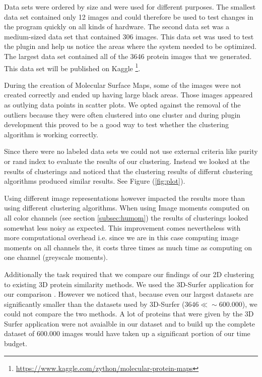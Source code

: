 \documentclass[journal]{vgtc}       %
\begin{document}
Data sets were ordered by size and were used for different purposes. The smallest data set contained only 12 images and could therefore be used to test changes in the program quickly on all kinds of hardware. The second data set was a medium-sized data set that contained 306 images. This data set was used to test the plugin and help us notice the areas where the system needed to be optimized. The largest data set contained all of the 3646 protein images that we generated. This data set will be published on Kaggle \footnote{\url{https://www.kaggle.com/zython/molecular-protein-maps}}.

During the creation of Molecular Surface Maps, some of the images were not created correctly and ended up having  large  black areas. Those images appeared as outlying data points in scatter plots. We opted against the removal of the outliers because they were often clustered into one cluster and during plugin development this proved to be a good way to test whether the clustering algorithm is working correctly.

Since there were no labeled data sets we could not use external criteria like purity or rand index to evaluate the results of our clustering. Instead we looked at the results of clusterings and noticed that the clustering results of differnt clustering algorithms produced similar results. See Figure (\ref{fig:plot}).

Using different image representations however impacted the results more than using different clustering algorithms. When using Image moments computed on all color channels (see section \ref{subsec:humom}) the results of clusterings looked somewhat less noisy as expected. This improvement comes nevertheless with more computational overhead i.e. since we are in this case computing image moments on all channels the, it costs three times as much time as computing on one channel (greyscale moments).

Additionally the task required that we compare our findings of our 2D clustering to existing 3D protein similarity methods.
We used the 3D-Surfer application for our comparison \cite{3dsurfer}. However we noticed  that, because even our largest datasets are significantly smaller than the datasets used by 3D-Surfer ($3646 \ll \sim 600.000$), we could not compare the two methods. A lot of proteins that were given by the 3D Surfer application were not avaialble in our dataset and to build up the complete dataset of $600.000$ images would have taken up a significant portion of our time budget.
\end{document}
